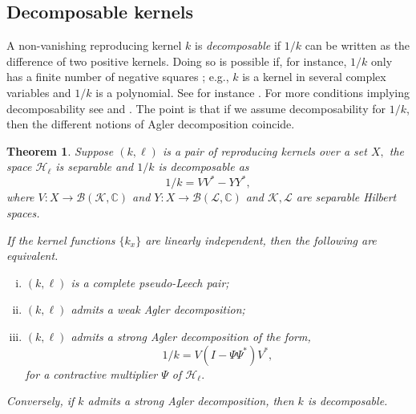 \documentclass[a4paper,reqno,index]{amsart}
\newcommand{\df}[1]{{\textit{#1}}{\index{#1}}}
\numberwithin{equation}{section}
\newtheorem{theorem}{Theorem}[section]
\newcommand{\cH}{\mathcal{H}}
\theoremstyle{definition}
\begin{document}
\subsection{Decomposable kernels}  \label{decompsec}
A non-vanishing reproducing kernel $k$ is \df{decomposable} if $1/k$ can be written as the difference of two positive kernels. Doing so is possible if, for instance, $1/k$ only has a finite number of negative squares \cite[Theorem 1.1.3]{RKPontryagin}; 
e.g.,  $k$ is a kernel in several complex variables and  $1/k$ is a polynomial. See for instance \cite{Polynomialarazyenglis}.
For more conditions implying decomposability see  \cite[Theorem 5.2]{Gheondea} and   \cite[Theorem 6.1]{CBkernels}.  The point is that if we assume decomposability for $1/k$, then the different notions of Agler decomposition coincide. 



\begin{theorem}\label{Leech=wAg=sAg}
Suppose  $(k, \ell)$ is a pair of reproducing kernels  over a set $X,$  the space $\cH_\ell$ is separable  
 and  $1/k$ is decomposable as 
 \begin{equation} \label{1/kLeech}
 1/k = VV^* -YY^*,
 \end{equation}
 where $V: X\to\mathcal{B}(\mathcal{K},\mathbb{C})$ and $Y:X\to\mathcal{B}(\mathcal{L},\mathbb{C})$ and  $\mathcal{K}, \mathcal{L}$
 are separable Hilbert spaces.

 If the kernel functions $\{k_x\}$ are linearly independent, then
the following are equivalent.
\begin{enumerate}[(i)]\itemsep=6pt
    \item  \label{LAGi} $(k, \ell)$ is a complete pseudo-Leech pair; 

     \item  \label{LAGii} $(k, \ell)$ admits a weak Agler decomposition; 

   \item  \label{LAGiii} $(k, \ell)$ admits a strong Agler decomposition of the form,
\begin{equation}\label{1/k-Leechdecomp}
     1/k = V(I-\Psi\Psi^*)V^*,
\end{equation}
 for a contractive multiplier $\Psi$ of $\cH_\ell.$
\end{enumerate}

Conversely, if $k$ admits a strong Agler decomposition, then $k$ is decomposable.
\end{theorem}
\end{document}
